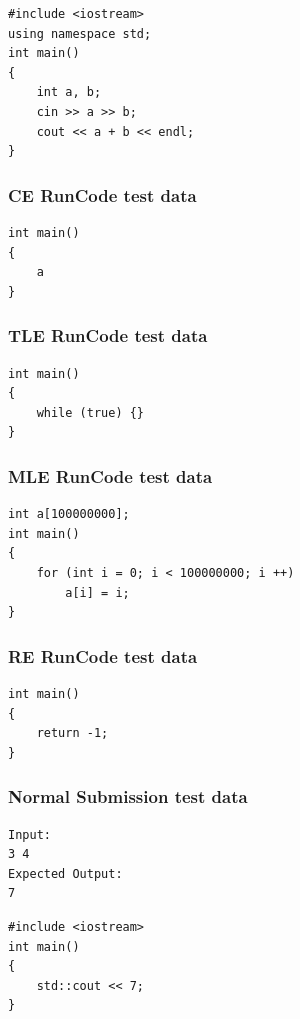 \documentclass[a4paper]{report}
\begin{document}
\begin{verbatim}
#include <iostream>
using namespace std;
int main()
{
    int a, b;
    cin >> a >> b;
    cout << a + b << endl;
}
\end{verbatim}

\subsubsection{CE RunCode test data}

\begin{verbatim}
int main()
{
    a
}
\end{verbatim}

\subsubsection{TLE RunCode test data}

\begin{verbatim}
int main()
{
    while (true) {}
}
\end{verbatim}

\subsubsection{MLE RunCode test data}

\begin{verbatim}
int a[100000000];
int main()
{
    for (int i = 0; i < 100000000; i ++)
        a[i] = i;
}
\end{verbatim}

\subsubsection{RE RunCode test data}

\begin{verbatim}
int main()
{
    return -1;
}
\end{verbatim}

\subsubsection{Normal Submission test data}

\begin{verbatim}
Input:
3 4
Expected Output:
7 
\end{verbatim}

\begin{verbatim}
#include <iostream>
int main()
{
    std::cout << 7;
}
\end{verbatim}
\end{document}
